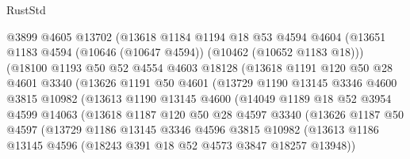 \begin{lexlean}{RustStd}
\begin{coremodule}
                    @3899
                    @4605
                    @13702
                    (@13618
                      @1184
                      @1194
                      @18
                      @53
                      @4594
                      @4604
                      (@13651 @1183 @4594 (@10646 (@10647 @4594)) (@10462 (@10652 @1183 @18)))
                      (@18100
                        @1193
                        @50
                        @52
                        @4554
                        @4603
                        @18128
                        (@13618
                          @1191
                          @120
                          @50
                          @28
                          @4601
                          @3340
                          (@13626
                            @1191
                            @50
                            @4601
                            (@13729
                              @1190
                              @13145
                              @3346
                              @4600
                              @3815
                              @10982
                              (@13613
                                @1190
                                @13145
                                @4600
                                (@14049
                                  @1189
                                  @18
                                  @52
                                  @3954
                                  @4599
                                  @14063
                                  (@13618
                                    @1187
                                    @120
                                    @50
                                    @28
                                    @4597
                                    @3340
                                    (@13626
                                      @1187
                                      @50
                                      @4597
                                      (@13729
                                        @1186
                                        @13145
                                        @3346
                                        @4596
                                        @3815
                                        @10982
                                        (@13613
                                          @1186
                                          @13145
                                          @4596
                                          (@18243 @391 @18 @52 @4573 @3847 @18257 @13948))

\end{coremodule}
\end{lexlean}
